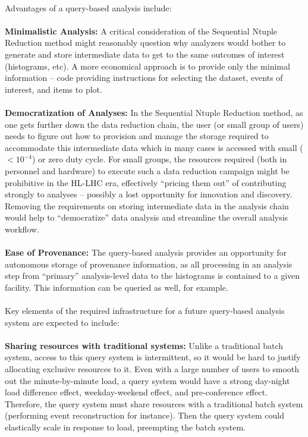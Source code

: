 \documentclass[12pt,a4paper]{article}
\begin{document}
~\\Advantages of a query-based analysis include:\\ \\
{\bf Minimalistic Analysis:} A critical consideration of the Sequential Ntuple Reduction method might reasonably question why analyzers would bother to generate and store intermediate data to get to the same outcomes of interest (histograms, etc). A more economical approach is to provide only the minimal information -- code providing instructions for selecting the dataset, events of interest, and items to plot. \\ \\
{\bf Democratization of Analyses:} In the Sequential Ntuple Reduction method, as one gets further down the data reduction chain, the user (or small group of users) needs to figure out how to provision and manage the storage required to accommodate this intermediate data which in many cases is accessed with small ($<10^{-4}$) or zero duty cycle. For small groups, the resources required (both in personnel and hardware) to execute such a data reduction campaign might be prohibitive in the HL-LHC era, effectively ``pricing them out'' of contributing strongly to analyses -- possibly a lost opportunity for innovation and discovery. Removing the requirements on storing intermediate data in the analysis chain would help to ``democratize'' data analysis and streamline the overall analysis workflow.\\ \\
{\bf Ease of Provenance:} The query-based analysis provides an opportunity for autonomous storage of provenance information, as all processing in an analysis step from ``primary'' analysis-level data to the histograms is contained to a given facility. This information can be queried as well, for example.\\ \\
Key elements of the required infrastructure for a future query-based analysis system are expected to include:\\ \\
{\bf Sharing resources with traditional systems:} Unlike a traditional batch system, access to this query system is intermittent, so it would be hard to justify allocating exclusive resources to it. Even with a large number of users to smooth out the minute-by-minute load, a query system would have a strong day-night load difference effect, weekday-weekend effect, and pre-conference effect. Therefore, the query system must share resources with a traditional batch system (performing event reconstruction for instance). Then the query system could elastically scale in response to load, preempting the batch system.\\ \\
\end{document}
